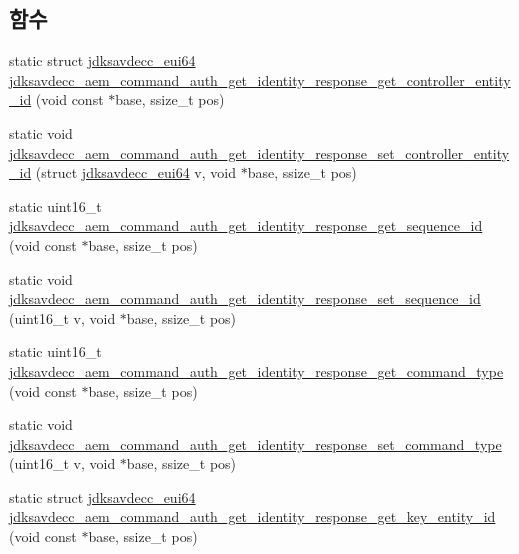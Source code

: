 \subsection*{함수}
\begin{DoxyCompactItemize}
\item 
static struct \hyperlink{structjdksavdecc__eui64}{jdksavdecc\+\_\+eui64} \hyperlink{group__command__auth__get__identity__response_ga5471fa39d3656bdb470bb79efe337813}{jdksavdecc\+\_\+aem\+\_\+command\+\_\+auth\+\_\+get\+\_\+identity\+\_\+response\+\_\+get\+\_\+controller\+\_\+entity\+\_\+id} (void const $\ast$base, ssize\+\_\+t pos)
\item 
static void \hyperlink{group__command__auth__get__identity__response_ga20213101f77239e80efe514cdfe84d22}{jdksavdecc\+\_\+aem\+\_\+command\+\_\+auth\+\_\+get\+\_\+identity\+\_\+response\+\_\+set\+\_\+controller\+\_\+entity\+\_\+id} (struct \hyperlink{structjdksavdecc__eui64}{jdksavdecc\+\_\+eui64} v, void $\ast$base, ssize\+\_\+t pos)
\item 
static uint16\+\_\+t \hyperlink{group__command__auth__get__identity__response_gaba52989816c65e9bf38c38c1e07c7888}{jdksavdecc\+\_\+aem\+\_\+command\+\_\+auth\+\_\+get\+\_\+identity\+\_\+response\+\_\+get\+\_\+sequence\+\_\+id} (void const $\ast$base, ssize\+\_\+t pos)
\item 
static void \hyperlink{group__command__auth__get__identity__response_ga304f78d196e21c23e5881c38aa839a09}{jdksavdecc\+\_\+aem\+\_\+command\+\_\+auth\+\_\+get\+\_\+identity\+\_\+response\+\_\+set\+\_\+sequence\+\_\+id} (uint16\+\_\+t v, void $\ast$base, ssize\+\_\+t pos)
\item 
static uint16\+\_\+t \hyperlink{group__command__auth__get__identity__response_ga64abe56714d5ffc20ccd1f7506b1b4c1}{jdksavdecc\+\_\+aem\+\_\+command\+\_\+auth\+\_\+get\+\_\+identity\+\_\+response\+\_\+get\+\_\+command\+\_\+type} (void const $\ast$base, ssize\+\_\+t pos)
\item 
static void \hyperlink{group__command__auth__get__identity__response_gaa7291911a0acbf7c57bb9652013188a4}{jdksavdecc\+\_\+aem\+\_\+command\+\_\+auth\+\_\+get\+\_\+identity\+\_\+response\+\_\+set\+\_\+command\+\_\+type} (uint16\+\_\+t v, void $\ast$base, ssize\+\_\+t pos)
\item 
static struct \hyperlink{structjdksavdecc__eui64}{jdksavdecc\+\_\+eui64} \hyperlink{group__command__auth__get__identity__response_ga7912b3d68fe6dc8834246a4838dafd10}{jdksavdecc\+\_\+aem\+\_\+command\+\_\+auth\+\_\+get\+\_\+identity\+\_\+response\+\_\+get\+\_\+key\+\_\+entity\+\_\+id} (void const $\ast$base, ssize\+\_\+t pos)

\end{DoxyCompactItemize}
